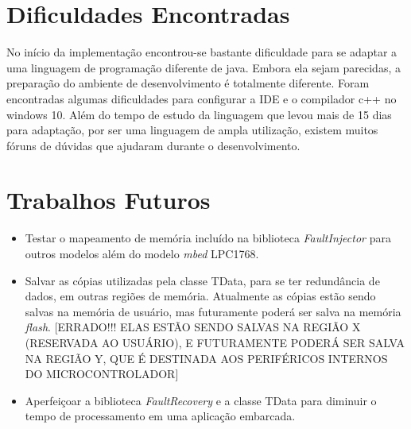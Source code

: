 \section{Dificuldades Encontradas}

No início da implementação encontrou-se bastante dificuldade para se adaptar a uma linguagem de programação diferente de java. Embora ela sejam parecidas, a preparação do ambiente de desenvolvimento é totalmente diferente. Foram encontradas algumas dificuldades para configurar a IDE e o compilador c++ no windows 10. Além do tempo de estudo da linguagem que levou mais de 15 dias para adaptação, por ser uma linguagem de ampla utilização, existem muitos fóruns de dúvidas que ajudaram durante o desenvolvimento. 

\section{Trabalhos Futuros} \label{Sec:TrabalhosFuturos}

\begin{itemize}

\item Testar o mapeamento de memória incluído na biblioteca \textit{FaultInjector} para outros modelos além do modelo \textit{mbed} LPC1768.

\item Salvar as cópias utilizadas pela classe TData, para se ter redundância de dados, em outras regiões de memória. Atualmente as cópias estão sendo salvas na memória de usuário, mas futuramente poderá ser salva na memória \textit{flash}. [ERRADO!!! ELAS ESTÃO SENDO SALVAS NA REGIÃO X (RESERVADA AO USUÁRIO), E FUTURAMENTE PODERÁ SER SALVA NA REGIÃO Y, QUE É DESTINADA AOS PERIFÉRICOS INTERNOS DO MICROCONTROLADOR]

\item Aperfeiçoar a biblioteca \textit{FaultRecovery} e a classe TData para diminuir o tempo de processamento em uma aplicação embarcada.

\end{itemize}
